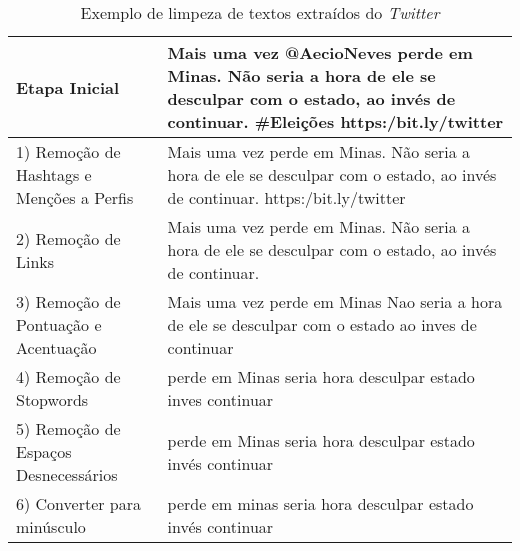 \begin{table}
    \centering
    \caption{Exemplo de limpeza de textos extraídos do \textit{Twitter}}
    \label{tb:limpeza}
    
    \begin{tabular}{l|p{8cm}} 
    \hline
    Etapa Inicial       & Mais uma vez @AecioNeves perde em Minas.   Não seria a hora de ele se desculpar com o estado,   ao invés de continuar.  \#Eleições https:/bit.ly/twitter \\ \hline
    1) Remoção de Hashtags  e Menções a Perfis  & Mais uma vez    perde em Minas. Não seria a hora de ele se desculpar com o estado, ao invés de continuar. https:/bit.ly/twitter \\ \hline
    2) Remoção de Links                                                                  & Mais uma      vez perde em Minas. Não seria a hora de ele se desculpar com o estado, ao invés de continuar.   \\ \hline                                                                                                                                                    
    3) Remoção de Pontuação e  Acentuação                                               & Mais uma      vez perde em Minas Nao seria a hora de ele se desculpar com o estado ao inves de continuar  \\ \hline                                                                                                                                             
    4) Remoção de Stopwords                                                              & perde em Minas  seria  hora  desculpar  estado  inves continuar \\ \hline                                                                                                                                                                                         
    5) Remoção de Espaços Desnecessários                                             & perde em Minas seria hora desculpar estado invés continuar   \\ \hline                                                                                                                                                                                            
    6) Converter para minúsculo                                                          & perde em minas seria hora desculpar estado invés continuar  \\ \hline                                                                                                                                                                                                   
    \end{tabular}
    \end{table}



